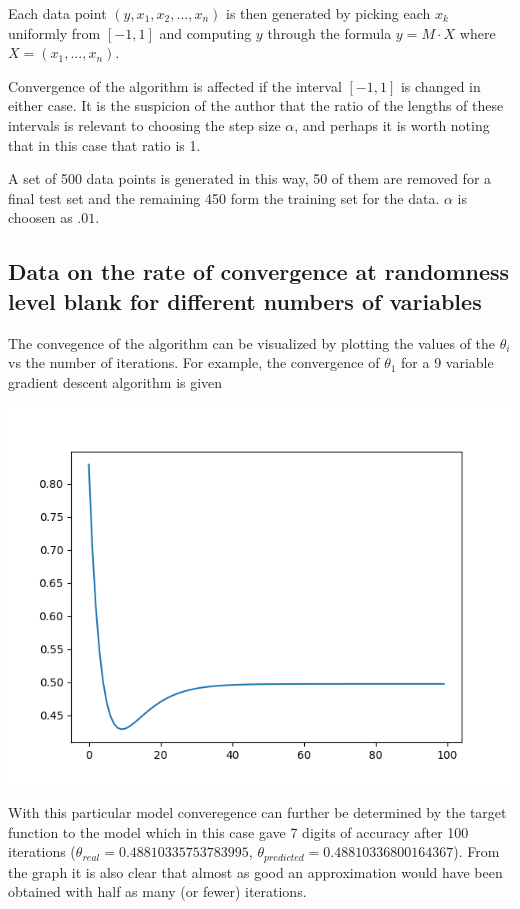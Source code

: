 \documentclass[11pt]{article} %
\begin{document}
Each data point $(y, x_{1}, x_{2}, ... , x_{n})$ is then generated by picking each $x_{k}$ uniformly from $[-1,1]$ and computing 
$y$ through the formula $y = M \cdot X$ where $X = (x_{1}, ... , x_{n})$.  

Convergence of the algorithm is affected if the interval $[-1,1]$ is changed in either case.  It is the suspicion of the author that the ratio of the lengths of these intervals is
relevant to choosing the step size $\alpha$, and perhaps it is worth noting that in this case that ratio is 1. 

A set of 500 data points is generated in this way, 50 of them are removed for a final test set and the remaining 450 form the training set for the data. $\alpha$ is choosen as $.01$. 

\subsection{Data on the rate of convergence at randomness level blank for different numbers of variables} 
The convegence of the algorithm can be visualized by plotting the values of the $\theta_{i}$ vs the number of iterations. For example, the convergence of $\theta_{1}$
for a 9 variable gradient descent algorithm is given 

\begin{center}
\includegraphics{925.png}
\end{center}

 With this particular model converegence can further be determined by the target function to the model which in this case gave 7 digits of accuracy after 100 iterations 
($\theta_{real} = 0.48810335753783995$, $\theta_{ predicted} = 0.48810336800164367$).  From the graph it is also clear that almost as good an approximation would have been obtained
with half as many (or fewer) iterations. 
 
\end{document}

